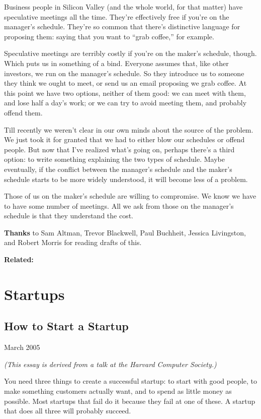 \documentclass[12pt]{book}
\begin{document}
Business people in Silicon Valley (and the whole world, for that matter)
have speculative meetings all the time. They're effectively free if
you're on the manager's schedule. They're so common that there's
distinctive language for proposing them: saying that you want to ``grab
coffee,'' for example.

Speculative meetings are terribly costly if you're on the maker's
schedule, though. Which puts us in something of a bind. Everyone assumes
that, like other investors, we run on the manager's schedule. So they
introduce us to someone they think we ought to meet, or send us an email
proposing we grab coffee. At this point we have two options, neither of
them good: we can meet with them, and lose half a day's work; or we can
try to avoid meeting them, and probably offend them.

Till recently we weren't clear in our own minds about the source of the
problem. We just took it for granted that we had to either blow our
schedules or offend people. But now that I've realized what's going on,
perhaps there's a third option: to write something explaining the two
types of schedule. Maybe eventually, if the conflict between the
manager's schedule and the maker's schedule starts to be more widely
understood, it will become less of a problem.

Those of us on the maker's schedule are willing to compromise. We know
we have to have some number of meetings. All we ask from those on the
manager's schedule is that they understand the cost.

\textbf{Thanks} to Sam Altman, Trevor Blackwell, Paul Buchheit, Jessica
Livingston, and Robert Morris for reading drafts of this.

\textbf{Related:}
\part{Startups}
\chapter{How to Start a Startup}

March 2005

\emph{(This essay is derived from a talk at the Harvard Computer
Society.)}

You need three things to create a successful startup: to start with good
people, to make something customers actually want, and to spend as
little money as possible. Most startups that fail do it because they
fail at one of these. A startup that does all three will probably
succeed.
\end{document}
